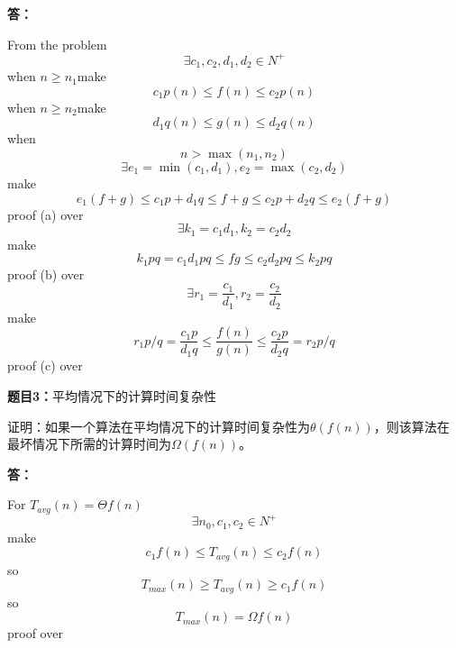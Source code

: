 \documentclass[12pt,a4paper]{article}
\begin{document}
\begin{CJK*}{UTF8}{gbsn}
  \vspace{5pt}
  \noindent
  {\bf 答：}

    From the problem
    $$\exists c_1,c_2,d_1,d_2 \in N^+$$
    when $n \geq n_1$make
    $$c_1p(n) \leq f(n) \leq c_2p(n)$$
    when $n \geq n_2$make
    $$d_1q(n) \leq g(n) \leq d_2q(n)$$
    when
    $$n > \max(n_1,n_2)$$
    $$\exists e_1 = \min(c_1,d_1), e_2 = \max(c_2,d_2)$$
    make
    $$e_1(f+g) \leq c_1p + d_1q \leq f+g \leq c_2p + d_2q \leq e_2(f+g)$$
    proof (a) over
    $$\exists k_1 = c_1d_1, k_2 = c_2d_2$$
    make
    $$k_1pq = c_1d_1pq \leq fg \leq c_2d_2pq \leq k_2pq$$
    proof (b) over
    $$\exists r_1 = \frac{c_1}{d_1}, r_2 = \frac{c_2}{d_2}$$
    make
    $$r_1p/q = \frac{c_1p}{d_1q} \leq \frac{f(n)}{g(n)} \leq \frac{c_2p}{d_2q} = r_2p/q$$
    proof (c) over


  \vspace{10pt}
  \noindent
  {\bf 题目3：}平均情况下的计算时间复杂性\par
  证明：如果一个算法在平均情况下的计算时间复杂性为$\theta(f(n))$，则该算法在最坏情况下所需的计算时间为$\Omega(f(n))$。

  \vspace{5pt}
  \noindent
  {\bf 答：}

  For $T_{avg}(n) = \varTheta{f(n)}$
  $$\exists n_0,c_1,c_2 \in N^+$$
  make
  $$c_1f(n) \leq T_{avg}(n) \leq c_2f(n)$$
  so 
  $$T_{max}(n) \geq T_{avg}(n) \geq c_1f(n)$$
  so 
  $$T_{max}(n) = \Omega{f(n)}$$
  proof over


\end{CJK*}
\end{document}
